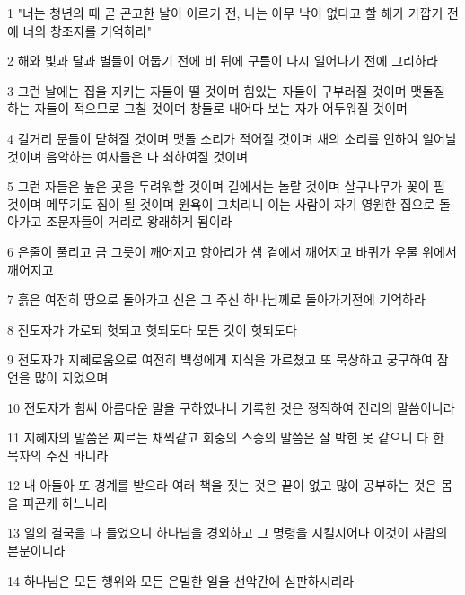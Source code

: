 \par 1 "너는 청년의 때 곧 곤고한 날이 이르기 전, 나는 아무 낙이 없다고 할 해가 가깝기 전에 너의 창조자를 기억하라"
\par 2 해와 빛과 달과 별들이 어둡기 전에 비 뒤에 구름이 다시 일어나기 전에 그리하라
\par 3 그런 날에는 집을 지키는 자들이 떨 것이며 힘있는 자들이 구부러질 것이며 맷돌질 하는 자들이 적으므로 그칠 것이며 창들로 내어다 보는 자가 어두워질 것이며
\par 4 길거리 문들이 닫혀질 것이며 맷돌 소리가 적어질 것이며 새의 소리를 인하여 일어날 것이며 음악하는 여자들은 다 쇠하여질 것이며
\par 5 그런 자들은 높은 곳을 두려워할 것이며 길에서는 놀랄 것이며 살구나무가 꽃이 필 것이며 메뚜기도 짐이 될 것이며 원욕이 그치리니 이는 사람이 자기 영원한 집으로 돌아가고 조문자들이 거리로 왕래하게 됨이라
\par 6 은줄이 풀리고 금 그릇이 깨어지고 항아리가 샘 곁에서 깨어지고 바퀴가 우물 위에서 깨어지고
\par 7 흙은 여전히 땅으로 돌아가고 신은 그 주신 하나님께로 돌아가기전에 기억하라
\par 8 전도자가 가로되 헛되고 헛되도다 모든 것이 헛되도다
\par 9 전도자가 지혜로움으로 여전히 백성에게 지식을 가르쳤고 또 묵상하고 궁구하여 잠언을 많이 지었으며
\par 10 전도자가 힘써 아름다운 말을 구하였나니 기록한 것은 정직하여 진리의 말씀이니라
\par 11 지혜자의 말씀은 찌르는 채찍같고 회중의 스승의 말씀은 잘 박힌 못 같으니 다 한 목자의 주신 바니라
\par 12 내 아들아 또 경계를 받으라 여러 책을 짓는 것은 끝이 없고 많이 공부하는 것은 몸을 피곤케 하느니라
\par 13 일의 결국을 다 들었으니 하나님을 경외하고 그 명령을 지킬지어다 이것이 사람의 본분이니라
\par 14 하나님은 모든 행위와 모든 은밀한 일을 선악간에 심판하시리라


